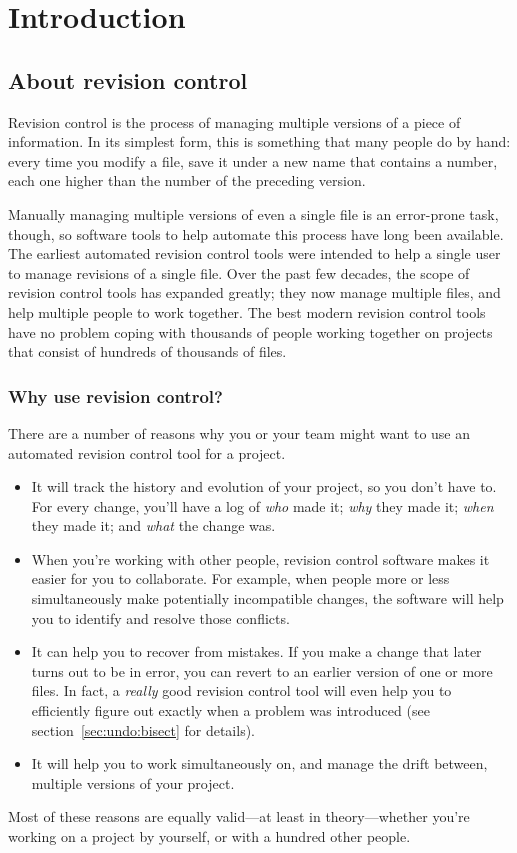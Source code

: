 \chapter{Introduction}
\label{chap:intro}

\section{About revision control}

Revision control is the process of managing multiple versions of a
piece of information.  In its simplest form, this is something that
many people do by hand: every time you modify a file, save it under a
new name that contains a number, each one higher than the number of
the preceding version.

Manually managing multiple versions of even a single file is an
error-prone task, though, so software tools to help automate this
process have long been available.  The earliest automated revision
control tools were intended to help a single user to manage revisions
of a single file.  Over the past few decades, the scope of revision
control tools has expanded greatly; they now manage multiple files,
and help multiple people to work together.  The best modern revision
control tools have no problem coping with thousands of people working
together on projects that consist of hundreds of thousands of files.

\subsection{Why use revision control?}

There are a number of reasons why you or your team might want to use
an automated revision control tool for a project.
\begin{itemize}
\item It will track the history and evolution of your project, so you
  don't have to.  For every change, you'll have a log of \emph{who}
  made it; \emph{why} they made it; \emph{when} they made it; and
  \emph{what} the change was.
\item When you're working with other people, revision control software
  makes it easier for you to collaborate.  For example, when people
  more or less simultaneously make potentially incompatible changes,
  the software will help you to identify and resolve those conflicts.
\item It can help you to recover from mistakes.  If you make a change
  that later turns out to be in error, you can revert to an earlier
  version of one or more files.  In fact, a \emph{really} good
  revision control tool will even help you to efficiently figure out
  exactly when a problem was introduced (see
  section~\ref{sec:undo:bisect} for details).
\item It will help you to work simultaneously on, and manage the drift
  between, multiple versions of your project.
\end{itemize}
Most of these reasons are equally valid---at least in theory---whether
you're working on a project by yourself, or with a hundred other
people.

